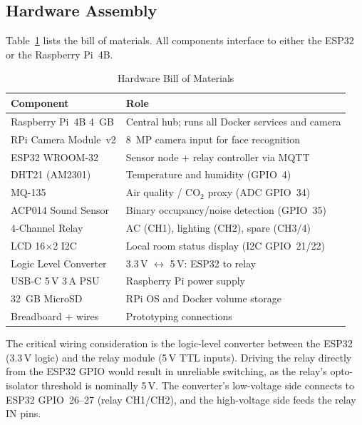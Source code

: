 \subsection{Hardware Assembly}
\label{subsec:hardware}

Table~\ref{tab:hardware_bom} lists the bill of materials.  All
components interface to either the ESP32 or the Raspberry Pi~4B.

\begin{table}[H]
\centering
\caption{Hardware Bill of Materials}
\label{tab:hardware_bom}
\begin{tabular}{@{}p{2.5cm}p{4.8cm}@{}}
\toprule
\textbf{Component} & \textbf{Role} \\
\midrule
Raspberry Pi~4B 4~GB  & Central hub; runs all Docker services and camera \\
RPi Camera Module~v2  & 8~MP camera input for face recognition \\
ESP32 WROOM-32        & Sensor node + relay controller via MQTT \\
DHT21 (AM2301)        & Temperature and humidity (GPIO~4) \\
MQ-135                & Air quality / CO$_2$ proxy (ADC GPIO~34) \\
ACP014 Sound Sensor   & Binary occupancy/noise detection (GPIO~35) \\
4-Channel Relay       & AC (CH1), lighting (CH2), spare (CH3/4) \\
LCD 16$\times$2 I2C   & Local room status display (I2C GPIO~21/22) \\
Logic Level Converter & 3.3\,V $\leftrightarrow$ 5\,V: ESP32 to relay \\
USB-C 5\,V 3\,A PSU  & Raspberry Pi power supply \\
32~GB MicroSD         & RPi OS and Docker volume storage \\
Breadboard + wires    & Prototyping connections \\
\bottomrule
\end{tabular}
\end{table}

The critical wiring consideration is the logic-level converter between
the ESP32 (3.3\,V logic) and the relay module (5\,V TTL inputs).
Driving the relay directly from the ESP32 GPIO would result in
unreliable switching, as the relay's opto-isolator threshold is
nominally 5\,V.  The converter's low-voltage side connects to ESP32
GPIO~26--27 (relay CH1/CH2), and the high-voltage side feeds the relay
IN pins.


